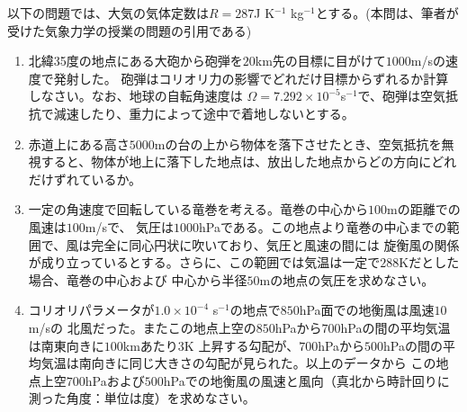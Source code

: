 \documentclass{jsarticle}
\newenvironment{problems}
{
  \renewcommand\labelenumi{\doublebox{\arabic{enumi}}}
  \begin{enumerate}
}{
  \end{enumerate}
  \renewcommand\labelenumi{\arabic{enumi}.}
}
\begin{document}
\begin{problems}
        以下の問題では、大気の気体定数は${R = 287}$J K$^{-1}$ kg$^{-1}$とする。(本問は、筆者が受けた気象力学の授業の問題の引用である)
        \begin{enumerate}[(1)]
        \item 北緯35度の地点にある大砲から砲弾を${20}$km先の目標に目がけて${1000}$m/sの速度で発射した。
            砲弾はコリオリ力の影響でどれだけ目標からずれるか計算しなさい。なお、地球の自転角速度は
            ${\Omega = 7.292 \times 10^{-5}}$s$^{-1}$で、砲弾は空気抵抗で減速したり、重力によって途中で着地しないとする。
        \item 赤道上にある高さ${5000}$mの台の上から物体を落下させたとき、空気抵抗を無視すると、物体が地上に落下した地点は、放出した地点からどの方向にどれだけずれているか。
        \item 一定の角速度で回転している竜巻を考える。竜巻の中心から${100}$mの距離での風速は${100}$m/sで、
            気圧は${1000}$hPaである。この地点より竜巻の中心までの範囲で、風は完全に同心円状に吹いており、気圧と風速の間には
            旋衡風の関係が成り立っているとする。さらに、この範囲では気温は一定で${288}$Kだとした場合、竜巻の中心および
            中心から半径${50}$mの地点の気圧を求めなさい。
        \item コリオリパラメータが${1.0 \times 10^{-4}}$ s$^{-1}$の地点で${850}$hPa面での地衡風は風速${10}$m/sの
            北風だった。またこの地点上空の${850}$hPaから${700}$hPaの間の平均気温は南東向きに${100}$kmあたり${3}$K
            上昇する勾配が、${700}$hPaから${500}$hPaの間の平均気温は南向きに同じ大きさの勾配が見られた。以上のデータから
            この地点上空${700}$hPaおよび${500}$hPaでの地衡風の風速と風向（真北から時計回りに測った角度：単位は度）を求めなさい。
        \end{enumerate}

\end{problems}
\end{document}
